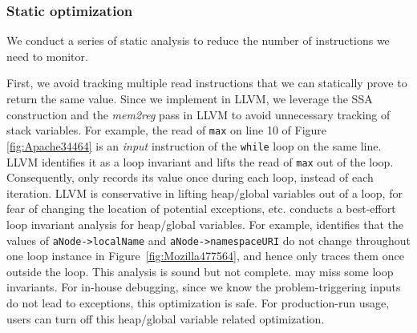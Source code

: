 



\subsubsection{Static optimization}
\label{sec:perf}

We conduct a series of static analysis to reduce the number of instructions we 
need to monitor. 

First, we avoid tracking multiple read instructions that we can statically 
prove to return the same value.
Since we implement \Tool in LLVM, we leverage the SSA construction and the
\textit{mem2reg} pass in LLVM to avoid unnecessary tracking of
stack variables.
For example, the read of \texttt{max} on line 10 of 
Figure \ref{fig:Apache34464} is an \textit{input} instruction of the 
\texttt{while} loop on the same line. LLVM identifies it as a loop invariant
and lifts the read of \texttt{max}
out of the loop. Consequently, \Tool only records
its value once during each loop, instead of each iteration.
LLVM is conservative in lifting heap/global variables out of
a loop, for fear of changing the location of potential exceptions, etc.
\Tool conducts a best-effort
loop invariant analysis for heap/global variables.
For example, \Tool identifies that the values of
\texttt{aNode->localName} and \texttt{aNode->namespaceURI} do not change
throughout one loop instance
in Figure~\ref{fig:Mozilla477564}, and hence only traces them once
outside the loop. This analysis is sound but not complete.
\Tool may miss some loop invariants. For in-house debugging, since we know
the problem-triggering inputs do not lead to exceptions, this optimization
is safe. For production-run usage, users can turn off this heap/global
variable related optimization.

